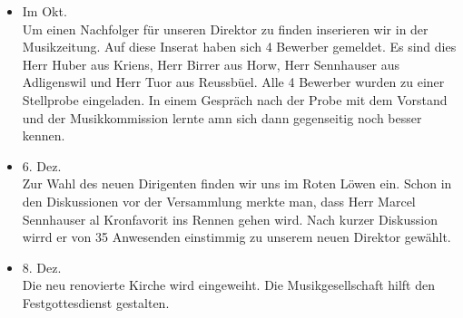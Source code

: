 \begin{history}
\begin{itemize}
        \item[]Im Okt.\\
        Um einen Nachfolger für unseren Direktor zu finden inserieren wir in der
        Musikzeitung. Auf diese Inserat haben sich 4 Bewerber gemeldet. Es sind
        dies Herr Huber aus Kriens, Herr Birrer aus Horw, Herr Sennhauser aus
        Adligenswil und Herr Tuor aus Reussbüel. Alle 4 Bewerber wurden zu einer
        Stellprobe eingeladen. In einem Gespräch nach der Probe mit dem Vorstand
        und der Musikkommission lernte amn sich dann gegenseitig noch besser
        kennen.

        \item[]6. Dez.\\
        Zur Wahl des neuen Dirigenten finden wir uns im Roten Löwen ein. Schon
        in den Diskussionen vor der Versammlung merkte man, dass Herr Marcel
        Sennhauser al Kronfavorit ins Rennen gehen wird. Nach kurzer Diskussion
        wirrd er von 35 Anwesenden einstimmig zu unserem neuen Direktor gewählt.

        \item[]8. Dez.\\
        Die neu renovierte Kirche wird eingeweiht. Die Musikgesellschaft hilft
        den Festgottesdienst gestalten.


    \end{itemize}

\end{history}

